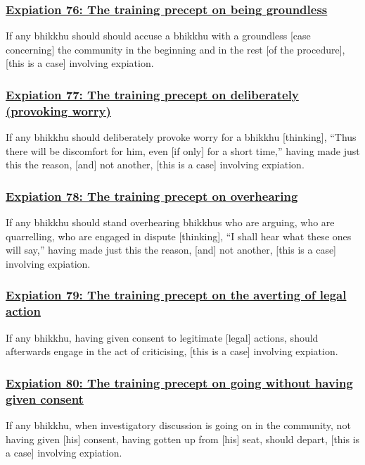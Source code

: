 \subsubsection*{\hyperref[pac76]{Expiation 76: The training precept on being groundless}}
\label{exp76}
If any bhikkhu should should accuse a bhikkhu with a groundless [case concerning] the community in the beginning and in the rest [of the procedure], [this is a case] involving expiation.

\subsubsection*{\hyperref[pac77]{Expiation 77: The training precept on deliberately (provoking worry)}}
\label{exp77}
If any bhikkhu should deliberately provoke worry for a bhikkhu [thinking], ``Thus there will be discomfort for him, even [if only] for a short time,'' having made just this the reason, [and] not another, [this is a case] involving expiation.

\subsubsection*{\hyperref[pac78]{Expiation 78: The training precept on overhearing}}
\label{exp78}
If any bhikkhu should stand overhearing bhikkhus who are arguing, who are quarrelling, who are engaged in dispute [thinking], ``I shall hear what these ones will say,'' having made just this the reason, [and] not another, [this is a case] involving expiation.

\subsubsection*{\hyperref[pac79]{Expiation 79: The training precept on the averting of legal action}}
\label{exp79}
If any bhikkhu, having given consent to legitimate [legal] actions, should afterwards engage in the act of criticising, [this is a case] involving expiation.

\subsubsection*{\hyperref[pac80]{Expiation 80: The training precept on going without having given consent}}
\label{exp80}
If any bhikkhu, when investigatory discussion is going on in the community, not having given [his] consent, having gotten up from [his] seat, should depart, [this is a case] involving expiation.

